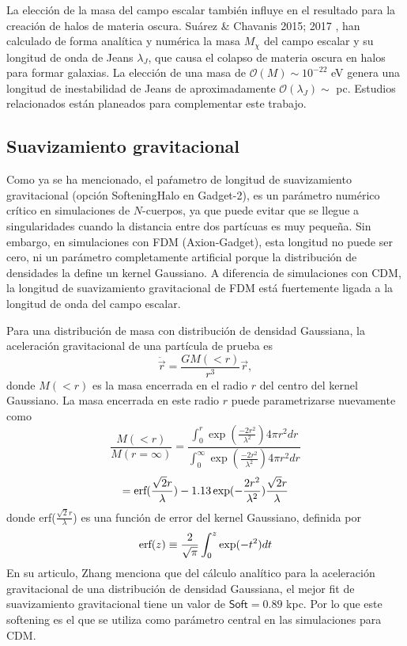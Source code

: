\documentclass[a4paper,openright,12pt]{book}
\begin{document}
La elección de la masa del campo escalar también influye en el resultado para la creación de halos de materia oscura. Suárez \& Chavanis 2015; 2017 \cite{4.3.6, 4.3.7}, han calculado de forma analítica y numérica la masa $M_{\chi}$ del campo escalar y su longitud de onda de Jeans $\lambda_{J}$, que causa el colapso de materia oscura en halos para formar galaxias. La elección de una masa de $\mathcal{O}(M)\sim 10^{-22}$ eV  genera una longitud de inestabilidad de Jeans de aproximadamente $\mathcal{O}(\lambda_{J})\sim$ pc. Estudios relacionados están planeados para complementar este trabajo.

\subsection*{Suavizamiento gravitacional}
Como ya se ha mencionado, el paŕametro de longitud de suavizamiento gravitacional (opción \textsf{SofteningHalo} en Gadget-2), es un parámetro numérico crítico en simulaciones de $N$-cuerpos, ya que puede evitar que se llegue a singularidades cuando la distancia entre dos partícuas es muy pequeña. Sin embargo, en simulaciones con FDM (Axion-Gadget), esta longitud no puede ser cero, ni un parámetro completamente artificial porque la distribución de densidades la define un kernel Gaussiano. A diferencia de simulaciones con CDM, la longitud de suavizamiento gravitacional de FDM está fuertemente ligada a la longitud de onda del campo escalar.

Para una distribución de masa con distribución de densidad Gaussiana, la aceleración gravitacional de una partícula de prueba es
\begin{equation}
\ddot{\vec{r}}= \frac{G M(<r)}{r^{3}}\vec{r},
\end{equation}
donde $M(<r)$ es la masa encerrada en el radio $r$ del centro del kernel Gaussiano. La masa encerrada en este radio $r$ puede parametrizarse nuevamente como
\begin{equation*}
\frac{M(<r)}{M(r=\infty)} = \frac{\int_{0}^{r}\exp(\frac{-2r^{2}}{\lambda^{2}})4\pi r^{2}dr}{\int_{0}^{\infty}\exp(\frac{-2r^{2}}{\lambda^{2}})4\pi r^{2}dr}
\end{equation*}
\begin{equation}
= \textup{erf}(\frac{\sqrt{2}r}{\lambda}) -1.13\exp(-\frac{2r^{2}}{\lambda^{2}})\frac{\sqrt{2}r}{\lambda}
\end{equation}
donde erf($\frac{\sqrt{2}r}{\lambda}$) es una función de error del kernel Gaussiano, definida por
\begin{equation*}
\textup{erf}(z) \equiv \frac{2}{\sqrt{\pi}}\int_{0}^{z}\exp(-t^{2})dt
\end{equation*}
En su articulo, Zhang menciona que del cálculo analítico para la aceleración gravitacional de una distribución de densidad Gaussiana, el mejor fit de suavizamiento gravitacional tiene un valor de $\textsf{Soft}=0.89$ kpc. Por lo que este softening es el que se utiliza como parámetro central en las simulaciones para CDM.
\end{document}
